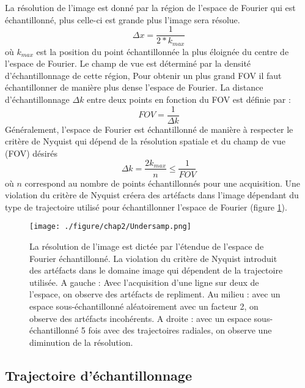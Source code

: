 La résolution de l'image est donné par la région de l'espace de Fourier qui est échantillonné, plus celle-ci est grande plus l'image sera résolue.
\begin{equation}
\Delta x = \frac{1}{2*k_{max}}
\end{equation}
où $k_{max}$ est la position du point échantillonnée la plus éloignée du centre de l'espace de Fourier. Le champ de vue est déterminé par la densité d'échantillonnage de cette région, Pour obtenir un plus grand FOV il faut échantillonner de manière plus dense l'espace de Fourier. La distance d'échantillonnage $\Delta k$  entre deux points en fonction du FOV est définie par :
\begin{equation}
\label{eq:FOV}
FOV = \frac{1}{\Delta k}
\end{equation}
Généralement, l'espace de Fourier est échantillonné de manière à respecter le critère de Nyquist qui dépend de la résolution spatiale et du champ de vue (FOV) désirés
\begin{equation}
\Delta k =\frac{2k_{max}}{n} \leq \frac{1}{FOV}
\end{equation}
où $n$ correspond au nombre de points échantillonnés pour une acquisition. Une violation du critère de Nyquist créera des artéfacts dans l'image dépendant du type de trajectoire utilisé pour échantillonner l'espace de Fourier (figure \ref{fig:Undersamp}).
\begin{figure}[H]
\centering
\texttt{[image: ./figure/chap2/Undersamp.png]}
\caption[Sous-échantillonnage]{\label{fig:Undersamp} La résolution de l'image est dictée par l'étendue de l'espace de Fourier échantillonné. La violation du critère de Nyquist introduit des artéfacts dans le domaine image qui dépendent de la trajectoire utilisée. A gauche : Avec l'acquisition d'une ligne sur deux de l'espace, on observe des artéfacts de repliment. Au milieu : avec un espace sous-échantillonné aléatoirement avec un facteur 2, on observe des artéfacts incohérents. A droite : avec un espace sous-échantillonné 5 fois avec des trajectoires radiales, on observe une diminution de la résolution.}
\end{figure}

\subsection{Trajectoire d'échantillonnage}

